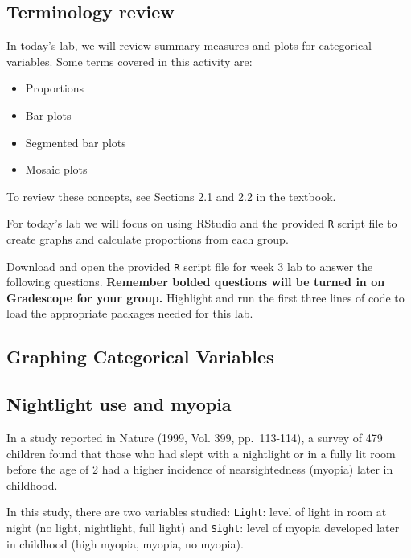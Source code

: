 \documentclass[
]{report}
\begin{document}
\hypertarget{terminology-review-5}{%
\subsection{Terminology review}\label{terminology-review-5}}

In today's lab, we will review summary measures and plots for categorical variables. Some terms covered in this activity are:

\begin{itemize}
\item
  Proportions
\item
  Bar plots
\item
  Segmented bar plots
\item
  Mosaic plots
\end{itemize}

To review these concepts, see Sections 2.1 and 2.2 in the textbook.

For today's lab we will focus on using RStudio and the provided \texttt{R} script file to create graphs and calculate proportions from each group.

Download and open the provided \texttt{R} script file for week 3 lab to answer the following questions. \textbf{Remember bolded questions will be turned in on Gradescope for your group.} Highlight and run the first three lines of code to load the appropriate packages needed for this lab.

\hypertarget{graphing-categorical-variables}{%
\subsection{Graphing Categorical Variables}\label{graphing-categorical-variables}}

\hypertarget{nightlight-use-and-myopia}{%
\subsection*{Nightlight use and myopia}\label{nightlight-use-and-myopia}}

In a study reported in Nature (1999, Vol. 399, pp.~113-114), a survey of 479 children found that those who had slept with a nightlight or in a fully lit room before the age of 2 had a higher incidence of nearsightedness (myopia) later in childhood.

In this study, there are two variables studied: \texttt{Light}: level of light in room at night (no light, nightlight, full light) and \texttt{Sight}: level of myopia developed later in childhood (high myopia, myopia, no myopia).
\end{document}
